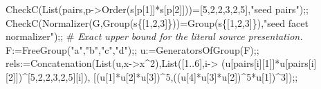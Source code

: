 \documentclass[
  10pt,
  letterpaper,
]{article}
\newenvironment{Shaded}{}{}
\newcommand{\BuiltInTok}[1]{\textcolor[rgb]{0.00,0.50,0.00}{#1}}
\newcommand{\CommentTok}[1]{\textcolor[rgb]{0.38,0.63,0.69}{\textit{#1}}}
\newcommand{\FloatTok}[1]{\textcolor[rgb]{0.25,0.63,0.44}{#1}}
\newcommand{\NormalTok}[1]{#1}
\newcommand{\OperatorTok}[1]{\textcolor[rgb]{0.40,0.40,0.40}{#1}}
\newcommand{\StringTok}[1]{\textcolor[rgb]{0.25,0.44,0.63}{#1}}
\newcommand{\VariableTok}[1]{\textcolor[rgb]{0.10,0.09,0.49}{#1}}
\begin{document}
\begin{Shaded}
\begin{Highlighting}[]
\VariableTok{CheckC}\NormalTok{(}\BuiltInTok{List}\NormalTok{(}\VariableTok{pairs}\OperatorTok{,}\VariableTok{p}\OperatorTok{{-}\textgreater{}}\BuiltInTok{Order}\NormalTok{(}\VariableTok{s}\NormalTok{[}\VariableTok{p}\NormalTok{[}\FloatTok{1}\NormalTok{]]}\OperatorTok{*}\VariableTok{s}\NormalTok{[}\VariableTok{p}\NormalTok{[}\FloatTok{2}\NormalTok{]]))}\OperatorTok{=}\NormalTok{[}\FloatTok{5}\OperatorTok{,}\FloatTok{2}\OperatorTok{,}\FloatTok{2}\OperatorTok{,}\FloatTok{3}\OperatorTok{,}\FloatTok{2}\OperatorTok{,}\FloatTok{5}\NormalTok{]}\OperatorTok{,}\StringTok{"seed pairs"}\NormalTok{)}\OperatorTok{;;}
\VariableTok{CheckC}\NormalTok{(}\BuiltInTok{Normalizer}\NormalTok{(}\VariableTok{G}\OperatorTok{,}\BuiltInTok{Group}\NormalTok{(}\VariableTok{s}\NormalTok{\{[}\FloatTok{1}\OperatorTok{,}\FloatTok{2}\OperatorTok{,}\FloatTok{3}\NormalTok{]\}))}\OperatorTok{=}\BuiltInTok{Group}\NormalTok{(}\VariableTok{s}\NormalTok{\{[}\FloatTok{1}\OperatorTok{,}\FloatTok{2}\OperatorTok{,}\FloatTok{3}\NormalTok{]\})}\OperatorTok{,}\StringTok{"seed facet normalizer"}\NormalTok{)}\OperatorTok{;;}
\NormalTok{\#}\CommentTok{ Exact upper bound for the literal source presentation.}
\VariableTok{F}\OperatorTok{:=}\BuiltInTok{FreeGroup}\NormalTok{(}\StringTok{"a"}\OperatorTok{,}\StringTok{"b"}\OperatorTok{,}\StringTok{"c"}\OperatorTok{,}\StringTok{"d"}\NormalTok{)}\OperatorTok{;;} \VariableTok{u}\OperatorTok{:=}\BuiltInTok{GeneratorsOfGroup}\NormalTok{(}\VariableTok{F}\NormalTok{)}\OperatorTok{;;}
\VariableTok{rels}\OperatorTok{:=}\BuiltInTok{Concatenation}\NormalTok{(}\BuiltInTok{List}\NormalTok{(}\VariableTok{u}\OperatorTok{,}\VariableTok{x}\OperatorTok{{-}\textgreater{}}\VariableTok{x}\OperatorTok{\^{}}\FloatTok{2}\NormalTok{)}\OperatorTok{,}\BuiltInTok{List}\NormalTok{([}\FloatTok{1}\OperatorTok{..}\FloatTok{6}\NormalTok{]}\OperatorTok{,}\VariableTok{i}\OperatorTok{{-}\textgreater{}}
\NormalTok{ (}\VariableTok{u}\NormalTok{[}\VariableTok{pairs}\NormalTok{[}\VariableTok{i}\NormalTok{][}\FloatTok{1}\NormalTok{]]}\OperatorTok{*}\VariableTok{u}\NormalTok{[}\VariableTok{pairs}\NormalTok{[}\VariableTok{i}\NormalTok{][}\FloatTok{2}\NormalTok{]])}\OperatorTok{\^{}}\NormalTok{[}\FloatTok{5}\OperatorTok{,}\FloatTok{2}\OperatorTok{,}\FloatTok{2}\OperatorTok{,}\FloatTok{3}\OperatorTok{,}\FloatTok{2}\OperatorTok{,}\FloatTok{5}\NormalTok{][}\VariableTok{i}\NormalTok{])}\OperatorTok{,}
\NormalTok{ [(}\VariableTok{u}\NormalTok{[}\FloatTok{1}\NormalTok{]}\OperatorTok{*}\VariableTok{u}\NormalTok{[}\FloatTok{2}\NormalTok{]}\OperatorTok{*}\VariableTok{u}\NormalTok{[}\FloatTok{3}\NormalTok{])}\OperatorTok{\^{}}\FloatTok{5}\OperatorTok{,}\NormalTok{((}\VariableTok{u}\NormalTok{[}\FloatTok{4}\NormalTok{]}\OperatorTok{*}\VariableTok{u}\NormalTok{[}\FloatTok{3}\NormalTok{]}\OperatorTok{*}\VariableTok{u}\NormalTok{[}\FloatTok{2}\NormalTok{])}\OperatorTok{\^{}}\FloatTok{5}\OperatorTok{*}\VariableTok{u}\NormalTok{[}\FloatTok{1}\NormalTok{])}\OperatorTok{\^{}}\FloatTok{3}\NormalTok{])}\OperatorTok{;;}

\end{Highlighting}
\end{Shaded}
\end{document}
